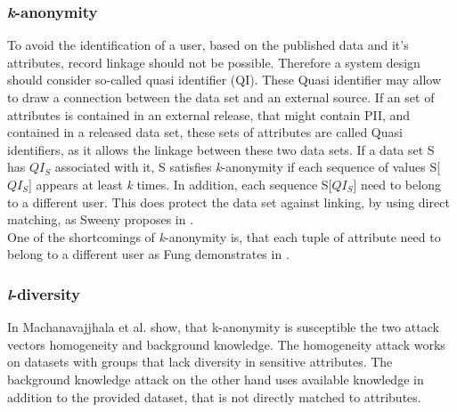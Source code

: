         \subsubsection{\textit{k}-anonymity}
            \label{subsec:related:kanon}
            To avoid the identification of a user, based on the published data and it's attributes, record linkage should not be possible. Therefore a system design should consider so-called quasi identifier (QI). These Quasi identifier may allow to draw a connection between the data set and an external source\cite{sweeney_k-anonymity_2002}.
            If an set of attributes is contained in an external release, that might contain PII, and contained in a released data set, these sets of attributes are called Quasi identifiers, as it allows the linkage between these two data sets.
            If a data set S has $QI_S$ associated with it, S satisfies \textit{k}-anonymity if each sequence of values S[$QI_S$] appears at least \textit{k} times. 
        	In addition, each sequence S[$QI_S$] need to belong to a different user.
        	This does protect the data set against linking, by using direct matching, as Sweeny proposes in \cite{sweeney_k-anonymity_2002}.\\
            
            One of the shortcomings of \textit{k}-anonymity is, that each tuple of attribute need to belong to a different user as Fung demonstrates in \cite{fung_introduction_2011}.

        \subsubsection{\textit{l}-diversity}
            \label{subsec:related:l-div}
            In \cite{machanavajjhala_l-diversity_2007} Machanavajjhala et al. show, that k-anonymity is susceptible the two attack vectors homogeneity and background knowledge.
            The homogeneity attack works on datasets with groups that lack diversity in sensitive attributes. The background knowledge attack on the other hand uses available knowledge in addition to the provided dataset, that is not directly matched to attributes.\\
            
            

